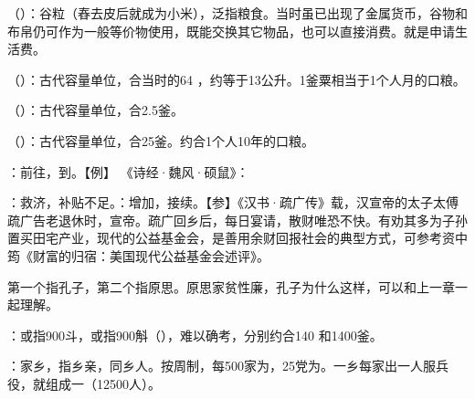 {
\item {}（）：谷粒（舂去皮后就成为小米），泛指粮食。当时虽已出现了金属货币，谷物和布帛仍可作为一般等价物使用，既能交换其它物品，也可以直接消费。就是申请生活费。
\item {}（）：古代容量单位，合当时的64 ，约等于13公升。1釜粟相当于1个人月的口粮。
\item {}（）：古代容量单位，合2.5釜。
\item {}（）：古代容量单位，合25釜。约合1个人10年的口粮。
\item {}：前往，到。【例】 《诗经·魏风·硕鼠》：
\item {}：救济，补贴不足。：增加，接续。【参】《汉书·疏广传》载，汉宣帝的太子太傅疏广告老退休时，宣帝。疏广回乡后，每日宴请，散财唯恐不快。有劝其多为子孙置买田宅产业，现代的公益基金会，是善用余财回报社会的典型方式，可参考资中筠《财富的归宿：美国现代公益基金会述评》。
}
{}


{
\item 第一个指孔子，第二个指原思。原思家贫性廉，孔子为什么这样，可以和上一章一起理解。
\item {}：或指900斗，或指900斛（），难以确考，分别约合140 和1400釜。
\item {}：家乡，指乡亲，同乡人。按周制，每500家为，25党为。一乡每家出一人服兵役，就组成一（12500人）。
}
{}


